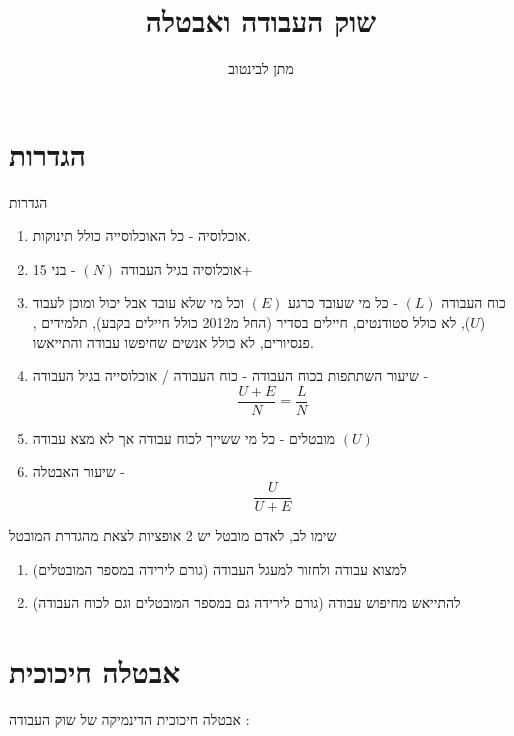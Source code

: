 \documentclass{beamer}
\title[תרגול 1 - אבטלה]{שוק העבודה ואבטלה}
\author{מתן לבינטוב}
\institute[{{ אב"ג}}]{{ אוניברסיטת בן גוריון בנגב}}
\date{}
\begin{document}
\begin{RTL}
\begin{frame}
\titlepage
\end{frame}
\begin{frame}
    \tableofcontents[sectionstyle=show,
    subsectionstyle=show/shaded/hide,
    subsubsectionstyle=show/shaded/hide]
\end{frame}

\section{הגדרות}
\begin{frame}[allowframebreaks]{הגדרות}
    \begin{enumerate}
        \item אוכלוסיה - כל האוכלוסייה כולל תינוקות.
        \item אוכלוסיה בגיל העבודה $(N)$ - בני 15+ 
        \item כוח העבודה $(L)$ - כל מי שעובד כרגע $(E)$ וכל מי שלא עובד אבל יכול ומוכן לעבוד ($U$), לא כולל סטודנטים, חיילים בסדיר (החל מ2012 כולל חיילים בקבע), תלמידים , פנסיורים, לא כולל אנשים שחיפשו עבודה והתייאשו.
        \item שיעור השתתפות בכוח העבודה - כוח העבודה / אוכלוסייה בגיל העבודה - $$\frac{U + E}{N} = \frac{L}{N}$$
        \item מובטלים - כל מי ששייך לכוח עבודה אך לא מצא עבודה $\left(U\right)$
        \item שיעור האבטלה - $$\frac{U}{U+E}$$
    \end{enumerate}
    
    \framebreak

    \begin{block}{שימו לב, לאדם מובטל יש 2 אופציות לצאת מהגדרת המובטל}
        \begin{enumerate}
            \item למצוא עבודה ולחזור למעגל העבודה (גורם לירידה במספר המובטלים)
            \item להתייאש מחיפוש עבודה (גורם לירידה גם במספר המובטלים וגם לכוח העבודה)
        \end{enumerate}
    \end{block}
\end{frame}
\section{אבטלה חיכוכית}
\begin{frame}[allowframebreaks]{אבטלה חיכוכית}
    הדינמיקה של שוק העבודה : 
    \begin{center}
        \begin{tikzpicture}[
            box/.style={rectangle, draw, minimum width=2.5cm, minimum height=1cm, fill=orange!30},
            myarrow/.style={-Stealth, thick, black}
        ][H]
        

\end{tikzpicture}
\end{center}
\end{frame}
\end{RTL}
\end{document}

